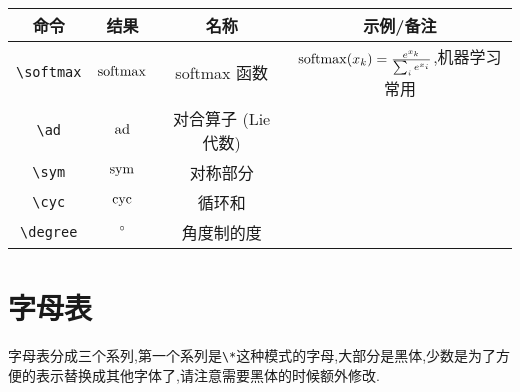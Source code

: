 \documentclass[lang=cn,12pt,scheme=chinese,mode=simple,black]{elegantbook}
\begin{document}
\begin{center}
    \setlength{\tabcolsep}{10pt}
    \begin{tabular}{|c|c|c|c|}
        \hline
        \textbf{命令}   & \textbf{结果} & \textbf{名称}       & \textbf{示例/备注}                                          \\
        \hline
        \verb|\softmax| & $\operatorname{softmax}$    & softmax 函数        & $\operatorname{softmax}(x_k)=\frac{e^{x_k}}{\sum_i e^{x_i}}$,机器学习常用 \\
        \verb|\ad|      & $\operatorname{ad}$         & 对合算子 (Lie 代数) &                                                             \\
        \verb|\sym|     & $\operatorname{sym}$        & 对称部分            &                                                             \\
        \verb|\cyc|     & $\operatorname{cyc}$        & 循环和              &                                                             \\
        \verb|\degree|  & $^{\circ}$     & 角度制的度          &                                                             \\
        \hline
    \end{tabular}
\end{center}

\newpage
\section{字母表}
字母表分成三个系列,第一个系列是\verb|\*|这种模式的字母,大部分是黑体,少数是为了方便的表示替换成其他字体了,请注意需要黑体的时候额外修改.
\end{document}
